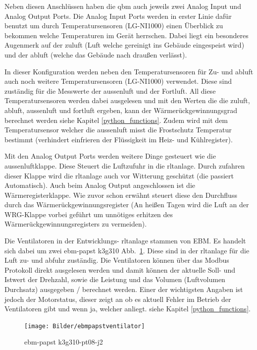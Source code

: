 Neben diesen Anschlüssen haben die \gls{qbm}  auch jeweils zwei Analog Input und Analog Output Ports. Die Analog Input Ports werden in erster Linie dafür benutzt um durch Temperatursensoren (LG-NI1000) einen Überblick zu bekommen welche Temperaturen im Gerät herrschen. Dabei liegt ein besonderes Augenmerk auf der \gls{zuluft} (Luft welche gereinigt ins Gebäude eingespeist wird) und der \gls{abluft} (welche das Gebäude nach draußen verlässt).

In dieser Konfiguration werden neben den Temperatursensoren für Zu- und \gls{abluft} auch noch weitere Temperatursensoren (LG-NI1000) verwendet. Diese sind zuständig für die Messwerte der \gls{aussenluft} und der Fortluft. All diese Temperatursensoren werden dabei ausgelesen und mit den Werten die die \gls{zuluft}, \gls{abluft}, \gls{aussenluft} und \gls{fortluft} ergeben, kann der Wärmerückgewinnungsgrad berechnet werden siehe Kapitel \ref{python_functions}. Zudem wird mit dem Temperatursensor welcher die \gls{aussenluft} misst die Frostschutz Temperatur bestimmt (verhindert einfrieren der Flüssigkeit im Heiz- und Kühlregister).

Mit den Analog Output Ports werden weitere Dinge gesteuert wie \zB die \gls{aussenluft}klappe. Diese Steuert die Luftzufuhr in die \ac{rltanlage}. Durch zufahren dieser Klappe wird die \ac{rltanlage} auch vor Witterung geschützt (die passiert Automatisch). Auch beim Analog Output angeschlossen ist die Wärmeregisterklappe. Wie zuvor schon erwähnt steuert diese den Durchfluss durch das Wärmerückgewinnungsregister (An heißen Tagen wird die Luft an der WRG-Klappe vorbei geführt um unnötiges erhitzen des Wärmerückgewinnungsregisters zu vermeiden).

Die Ventilatoren in der Entwicklungs- \ac{rltanlage} stammen von EBM. Es handelt sich dabei um zwei ebm-papst k3g310 Abb.~\ref{fig:ebmpapstventilator}. Diese sind in der \ac{rltanlage} für die Luft zu- und abfuhr zuständig. Die Ventilatoren können über das Modbus Protokoll direkt ausgelesen werden und damit können der aktuelle Soll- und Istwert der Drehzahl, sowie die Leistung und das Volumen (Luftvolumen Durchsatz) ausgegeben / berechnet werden. Einer der wichtigsten Angaben ist jedoch der Motorstatus, dieser zeigt an ob es aktuell Fehler im Betrieb der Ventilatoren gibt und wenn ja, welcher anliegt. siehe Kapitel \ref{python_functions}.

\begin{figure}[H]
	\centering
	\texttt{[image: Bilder/ebmpapstventilator]}
	\caption{ebm-papst k3g310-pt08-j2} 
	\label{fig:ebmpapstventilator}
\end{figure}

